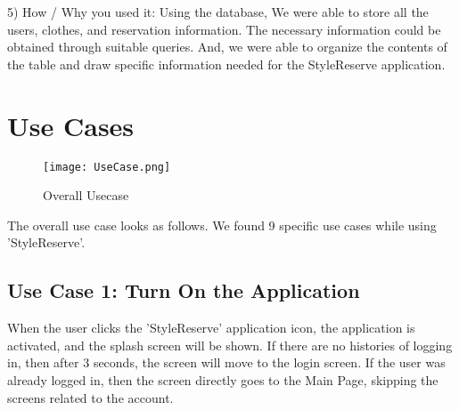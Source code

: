 \documentclass[conference]{IEEEtran}
\begin{document}
5) How / Why you used it: Using the database, We were able to store all the users, clothes, and reservation information. The necessary information could be obtained through suitable queries. And, we were able to organize the contents of the table and draw specific information needed for the StyleReserve application.\\

\section{Use Cases}
\begin{figure}[htbp]
\centerline{\texttt{[image: UseCase.png]}}
\label{fig}
\caption{Overall Usecase}
\end{figure}
The overall use case looks as follows. We found 9 specific use cases while using 'StyleReserve'.\\

\subsection{Use Case 1: Turn On the Application}
When the user clicks the 'StyleReserve' application icon, the application is activated, and the splash screen will be shown. If there are no histories of logging in, then after 3 seconds, the screen will move to the login screen. If the user was already logged in, then the screen directly goes to the Main Page, skipping the screens related to the account.\\
    
\end{document}
